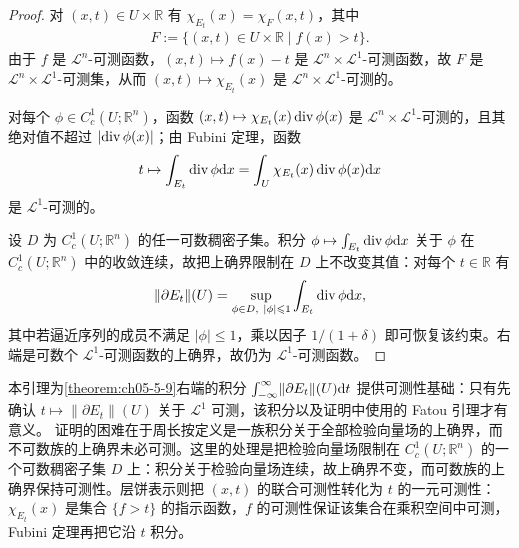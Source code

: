 \documentclass[../../main.tex]{subfiles}%
\begin{document}
\begin{proof}
对 $(x,t)\in U\times\mathbb{R}$ 有 $\chi_{E_t}(x)=\chi_F(x,t)$，其中
\begin{align*}
F:=\{(x,t)\in U\times\mathbb{R}\mid f(x)>t\}.
\end{align*}
由于 $f$ 是 $\mathcal{L}^n$-可测函数，$(x,t)\mapsto f(x)-t$ 是 $\mathcal{L}^n\times\mathcal{L}^1$-可测函数，故 $F$ 是 $\mathcal{L}^n\times\mathcal{L}^1$-可测集，从而 $(x,t)\mapsto\chi_{E_t}(x)$ 是 $\mathcal{L}^n\times\mathcal{L}^1$-可测的。

对每个 $\phi\in C_c^1(U;\mathbb{R}^n)$，函数 $(x,t)\mapsto\chi_{E_t}(x)\operatorname{div}\phi(x)$ 是 $\mathcal{L}^n\times\mathcal{L}^1$-可测的，且其绝对值不超过 $\lvert\operatorname{div}\phi(x)\rvert$；由 Fubini 定理，函数
\begin{align*}
t\mapsto\int_{E_t}\operatorname{div}\phi\mathrm{d} x=\int_U\chi_{E_t}(x)\operatorname{div}\phi(x)\mathrm{d} x
\end{align*}
是 $\mathcal{L}^1$-可测的。

设 $D$ 为 $C_c^1(U;\mathbb{R}^n)$ 的任一可数稠密子集。积分 $\phi\mapsto\int_{E_t}\operatorname{div}\phi\mathrm{d} x$ 关于 $\phi$ 在 $C_c^1(U;\mathbb{R}^n)$ 中的收敛连续，故把上确界限制在 $D$ 上不改变其值：对每个 $t\in\mathbb{R}$ 有
\begin{align*}
\lVert\partial E_t\rVert(U)=\sup_{\phi\in D,\ \lvert\phi\rvert\leqslant1}\int_{E_t}\diver\phi\diff x,
\end{align*}
其中若逼近序列的成员不满足 $\lvert\phi\rvert\leqslant1$，乘以因子 $1/(1+\delta)$ 即可恢复该约束。右端是可数个 $\mathcal{L}^1$-可测函数的上确界，故仍为 $\mathcal{L}^1$-可测函数。
\end{proof}

\begin{remark}\label{remark:ch05-lem-5-1-动机}
本引理为\cref{theorem:ch05-5-9}右端的积分 $\int_{-\infty}^{\infty}\lVert\partial E_t\rVert(U)\mathrm{d} t$ 提供可测性基础：只有先确认 $t\mapsto\lVert\partial E_t\rVert(U)$ 关于 $\mathcal{L}^1$ 可测，该积分以及证明中使用的 Fatou 引理才有意义。%
证明的困难在于周长按定义是一族积分关于全部检验向量场的上确界，而不可数族的上确界未必可测。这里的处理是把检验向量场限制在 $C_c^1(U;\mathbb{R}^n)$ 的一个可数稠密子集 $D$ 上：积分关于检验向量场连续，故上确界不变，而可数族的上确界保持可测性。层饼表示则把 $(x,t)$ 的联合可测性转化为 $t$ 的一元可测性：$\chi_{E_t}(x)$ 是集合 $\{f>t\}$ 的指示函数，$f$ 的可测性保证该集合在乘积空间中可测，Fubini 定理再把它沿 $t$ 积分。
\end{remark}
\end{document}
